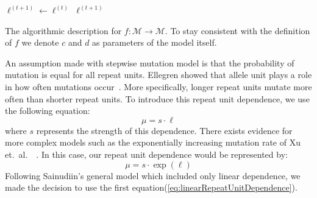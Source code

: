 
\begin{algorithm}[t]
    \SetAlgoLined
    \DontPrintSemicolon
     {
        $\ell^{(t+1)} \gets \ell^{(t)}$ \;
        \Return $\ell^{(t+1)}$ \;
    }
    \caption{The algorithmic description for $f: \mathcal{M} \rightarrow \mathcal{M}$.
    To stay consistent with the definition of $f$ we denote $c$ and $d$ as parameters of the model itself.}
    \label{alg:mutateFunction}
\end{algorithm}

An assumption made with stepwise mutation model is that the probability of mutation is equal for all repeat units.
Ellegren showed that allele unit plays a role in how often mutations
occur~\cite{ellegrenHeterogeneousMutationProcesses2000}.
More specifically, longer repeat units mutate more often than shorter repeat units.
To introduce this repeat unit dependence, we use the following equation:
\begin{equation}\label{eq:linearRepeatUnitDependence}
    \mu = s \cdot \ell
\end{equation}
where $s$ represents the strength of this dependence.
There exists evidence for more complex models such as the exponentially increasing mutation rate of Xu et.\ al.\
~\cite{xuDirectionMicrosatelliteMutations2000}.
In this case, our repeat unit dependence would be represented by:
\begin{equation}
    \mu = s \cdot \exp (\ell)
\end{equation}
Following Sainudiin's general model which included only linear dependence, we made the decision to use the first
equation(\autoref{eq:linearRepeatUnitDependence}).

